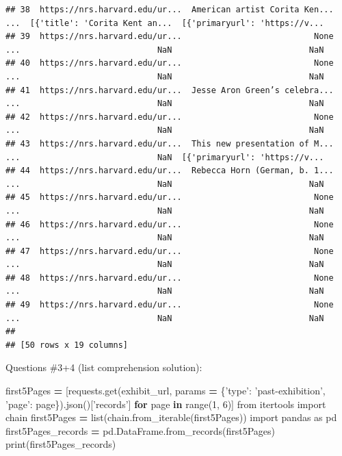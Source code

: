 \documentclass[]{book}
\newenvironment{Shaded}{\begin{snugshade}}{\end{snugshade}}
\newcommand{\BuiltInTok}[1]{#1}
\newcommand{\ControlFlowTok}[1]{\textcolor[rgb]{0.13,0.29,0.53}{\textbf{#1}}}
\newcommand{\DecValTok}[1]{\textcolor[rgb]{0.00,0.00,0.81}{#1}}
\newcommand{\ImportTok}[1]{#1}
\newcommand{\KeywordTok}[1]{\textcolor[rgb]{0.13,0.29,0.53}{\textbf{#1}}}
\newcommand{\NormalTok}[1]{#1}
\newcommand{\OperatorTok}[1]{\textcolor[rgb]{0.81,0.36,0.00}{\textbf{#1}}}
\newcommand{\StringTok}[1]{\textcolor[rgb]{0.31,0.60,0.02}{#1}}
\begin{document}
\begin{verbatim}
## 38  https://nrs.harvard.edu/ur...  American artist Corita Ken...  ...  [{'title': 'Corita Kent an...  [{'primaryurl': 'https://v...
## 39  https://nrs.harvard.edu/ur...                           None  ...                            NaN                            NaN
## 40  https://nrs.harvard.edu/ur...                           None  ...                            NaN                            NaN
## 41  https://nrs.harvard.edu/ur...  Jesse Aron Green’s celebra...  ...                            NaN                            NaN
## 42  https://nrs.harvard.edu/ur...                           None  ...                            NaN                            NaN
## 43  https://nrs.harvard.edu/ur...  This new presentation of M...  ...                            NaN  [{'primaryurl': 'https://v...
## 44  https://nrs.harvard.edu/ur...  Rebecca Horn (German, b. 1...  ...                            NaN                            NaN
## 45  https://nrs.harvard.edu/ur...                           None  ...                            NaN                            NaN
## 46  https://nrs.harvard.edu/ur...                           None  ...                            NaN                            NaN
## 47  https://nrs.harvard.edu/ur...                           None  ...                            NaN                            NaN
## 48  https://nrs.harvard.edu/ur...                           None  ...                            NaN                            NaN
## 49  https://nrs.harvard.edu/ur...                           None  ...                            NaN                            NaN
## 
## [50 rows x 19 columns]
\end{verbatim}

Questions \#3+4 (list comprehension solution):

\begin{Shaded}
\begin{Highlighting}[]
\NormalTok{first5Pages }\OperatorTok{=}\NormalTok{ [requests.get(exhibit_url, params }\OperatorTok{=}\NormalTok{ \{}\StringTok{'type'}\NormalTok{: }\StringTok{'past-exhibition'}\NormalTok{, }\StringTok{'page'}\NormalTok{: page\}).json()[}\StringTok{'records'}\NormalTok{] }\ControlFlowTok{for}\NormalTok{ page }\KeywordTok{in} \BuiltInTok{range}\NormalTok{(}\DecValTok{1}\NormalTok{, }\DecValTok{6}\NormalTok{)]}
\ImportTok{from}\NormalTok{ itertools }\ImportTok{import}\NormalTok{ chain}
\NormalTok{first5Pages }\OperatorTok{=} \BuiltInTok{list}\NormalTok{(chain.from_iterable(first5Pages))}
\ImportTok{import}\NormalTok{ pandas }\ImportTok{as}\NormalTok{ pd}
\NormalTok{first5Pages_records }\OperatorTok{=}\NormalTok{ pd.DataFrame.from_records(first5Pages)}
\BuiltInTok{print}\NormalTok{(first5Pages_records)}
\end{Highlighting}
\end{Shaded}
\end{document}
